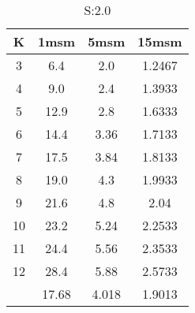 \begin{table}[H]
\centering
\begin{tabular}{c|ccc}
K &1msm &5msm &15msm\\
\hline
3 & 6.4 & 2.0 & 1.2467\\
4 & 9.0 & 2.4 & 1.3933\\
5 & 12.9 & 2.8 & 1.6333\\
6 & 14.4 & 3.36 & 1.7133\\
7 & 17.5 & 3.84 & 1.8133\\
8 & 19.0 & 4.3 & 1.9933\\
9 & 21.6 & 4.8 & 2.04\\
10 & 23.2 & 5.24 & 2.2533\\
11 & 24.4 & 5.56 & 2.3533\\
12 & 28.4 & 5.88 & 2.5733\\
\hline
& 17.68 & 4.018 & 1.9013\\
\end{tabular}
\caption{S:2.0}
\label{tab:s2.0}
\end{table}
